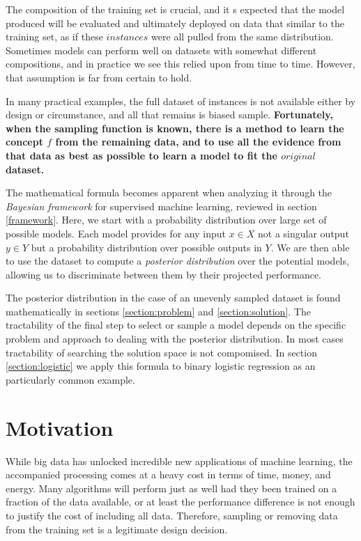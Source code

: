 \documentclass[twoside]{article}
\begin{document}
The composition of the training set is crucial, and it s expected that the model produced will be evaluated and ultimately deployed on data that similar to the training set, as if these \(instances\) were all pulled from the same distribution. Sometimes models can perform well on datasets with somewhat different compositions, and in practice we see this relied upon from time to time. However, that assumption is far from certain to hold.

In many practical examples, the full dataset of instances is not available either by design or circumstance, and all that remains is biased sample. \textbf{Fortunately, when the sampling function is known, there is a method to learn the concept \(f\) from the remaining data, and to use all the evidence from that data as best as possible to learn a model to fit the \(original\) dataset.} 

The mathematical formula becomes apparent when analyzing it through the \textit{Bayesian framework} for supervised machine learning, reviewed in section \ref{framework}. Here, we start with a probability distribution over large set of possible models. Each model provides for any input \(x \in X\) not a singular output \(y \in Y\) but a probability distribution over possible outputs in \(Y\). We are then able to use the dataset to compute a \textit{posterior distribution} over the potential models, allowing us to discriminate between them by their projected performance.

The posterior distribution in the case of an unevenly sampled dataset is found mathematically in sections \ref{section:problem} and \ref{section:solution}. The tractability of the final step to select or sample a model depends on the specific problem and approach to dealing with the posterior distribution. In most cases tractability of searching the solution space is not compomised. In section \ref{section:logistic} we apply this formula to binary logistic regression as an particularly common example.

\section{Motivation}

While big data has unlocked incredible new applications of machine learning, the accompanied processing comes at a heavy cost in terms of time, money, and energy. Many algorithms will perform just as well had they been trained on a fraction of the data available, or at least the performance difference is not enough to justify the cost of including all data. Therefore, sampling or removing data from the training set is a legitimate design decision.
\end{document}

